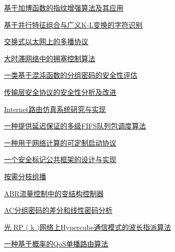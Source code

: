\documentclass[a4paper]{article}
\begin{document}
\href{http://www.jos.org.cn/ch/reader/download_pdf.aspx?file_no=20030324&year_id=2003&quarter_id=3&falg=1}{基于加博函数的指纹增强算法及其应用}

\href{http://www.jos.org.cn/ch/reader/download_pdf.aspx?file_no=20030325&year_id=2003&quarter_id=3&falg=1}{基于并行特征组合与广义K-L变换的字符识别}

\href{http://www.jos.org.cn/ch/reader/download_pdf.aspx?file_no=20030326&year_id=2003&quarter_id=3&falg=1}{交换式以太网上的多播协议}

\href{http://www.jos.org.cn/ch/reader/download_pdf.aspx?file_no=20030327&year_id=2003&quarter_id=3&falg=1}{大时滞网络中的拥塞控制算法}

\href{http://www.jos.org.cn/ch/reader/download_pdf.aspx?file_no=20030328&year_id=2003&quarter_id=3&falg=1}{一类基于混沌函数的分组密码的安全性评估}

\href{http://www.jos.org.cn/ch/reader/download_pdf.aspx?file_no=20030329&year_id=2003&quarter_id=3&falg=1}{传输层安全协议的安全性分析及改进}

\href{http://www.jos.org.cn/ch/reader/download_pdf.aspx?file_no=20030330&year_id=2003&quarter_id=3&falg=1}{Internet路由仿真系统研究与实现}

\href{http://www.jos.org.cn/ch/reader/download_pdf.aspx?file_no=20030331&year_id=2003&quarter_id=3&falg=1}{一种提供延迟保证的多级FIFS队列包调度算法}

\href{http://www.jos.org.cn/ch/reader/download_pdf.aspx?file_no=20030332&year_id=2003&quarter_id=3&falg=1}{一种用于网络计算的可定制启动协议}

\href{http://www.jos.org.cn/ch/reader/download_pdf.aspx?file_no=20030333&year_id=2003&quarter_id=3&falg=1}{一个安全标记公共框架的设计与实现}

\href{http://www.jos.org.cn/ch/reader/download_pdf.aspx?file_no=20030334&year_id=2003&quarter_id=3&falg=1}{按需分枝组播}

\href{http://www.jos.org.cn/ch/reader/download_pdf.aspx?file_no=20030335&year_id=2003&quarter_id=3&falg=1}{ABR流量控制中的变结构控制器}

\href{http://www.jos.org.cn/ch/reader/download_pdf.aspx?file_no=20030336&year_id=2003&quarter_id=3&falg=1}{AC分组密码的差分和线性密码分析}

\href{http://www.jos.org.cn/ch/reader/download_pdf.aspx?file_no=20030337&year_id=2003&quarter_id=3&falg=1}{光 RP ( k )网络上Hypercube通信模式的波长指派算法}

\href{http://www.jos.org.cn/ch/reader/download_pdf.aspx?file_no=20030338&year_id=2003&quarter_id=3&falg=1}{一种基于概率的QoS单播路由算法}
\end{document}
